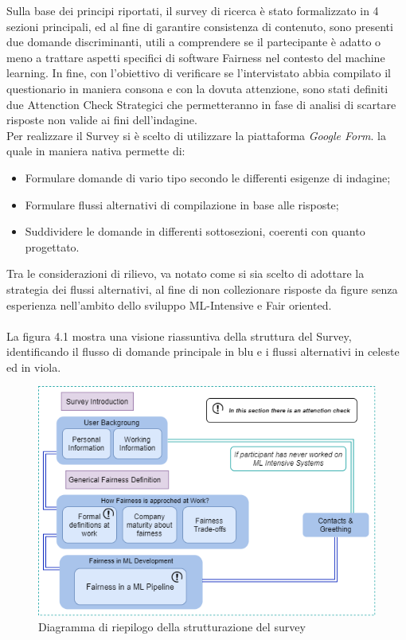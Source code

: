     Sulla base dei principi riportati, il survey di ricerca è stato formalizzato in 4 sezioni principali, ed al fine di garantire consistenza di contenuto, sono presenti due domande discriminanti, utili a comprendere se il partecipante è adatto o meno a trattare aspetti specifici di software Fairness nel contesto del machine learning. In fine, con l'obiettivo di verificare se l'intervistato abbia compilato il questionario in maniera consona e con la dovuta attenzione, sono stati definiti due Attenction Check Strategici che permetteranno in fase di analisi di scartare risposte non valide ai fini dell'indagine.\\ 
    
    Per realizzare il Survey si è scelto di utilizzare la piattaforma \emph{Google Form}. la quale in maniera nativa permette di:
    \
    \begin{itemize}
        \item Formulare domande di vario tipo secondo le differenti esigenze di indagine;
        \item Formulare flussi alternativi di compilazione in base alle risposte;
        \item Suddividere le domande in differenti sottosezioni, coerenti con quanto progettato.
    \end{itemize}
    
    Tra le considerazioni di rilievo, va notato come si sia scelto di adottare la strategia dei flussi alternativi, al fine di non collezionare risposte da figure senza esperienza nell'ambito dello sviluppo ML-Intensive e Fair oriented.\\ \\
    
    La figura 4.1 mostra una visione riassuntiva della struttura del Survey, identificando il flusso di domande principale in blu e i flussi alternativi in celeste ed in viola. 
    \begin{figure}[h]
        \centering
        \includegraphics[width=1\textwidth]{figure/Survey Structural diagram.png}
        \caption{Diagramma di riepilogo della strutturazione del survey}
    \end{figure}
    
